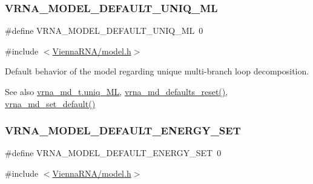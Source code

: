 \subsubsection{\texorpdfstring{V\+R\+N\+A\+\_\+\+M\+O\+D\+E\+L\+\_\+\+D\+E\+F\+A\+U\+L\+T\+\_\+\+U\+N\+I\+Q\+\_\+\+ML}{VRNA\_MODEL\_DEFAULT\_UNIQ\_ML}}
{\footnotesize\ttfamily \#define V\+R\+N\+A\+\_\+\+M\+O\+D\+E\+L\+\_\+\+D\+E\+F\+A\+U\+L\+T\+\_\+\+U\+N\+I\+Q\+\_\+\+ML~0}



{\ttfamily \#include $<$\hyperlink{model_8h}{Vienna\+R\+N\+A/model.\+h}$>$}



Default behavior of the model regarding unique multi-\/branch loop decomposition. 

\begin{DoxySeeAlso}{See also}
\hyperlink{group__model__details_ade065b814a4e2e72ead93ab502613ed2}{vrna\+\_\+md\+\_\+t.\+uniq\+\_\+\+ML}, \hyperlink{group__model__details_ga70834424cf804d149937de89f80ceb45}{vrna\+\_\+md\+\_\+defaults\+\_\+reset()}, \hyperlink{group__model__details_ga8ac6ff84936282436f822644bf841f66}{vrna\+\_\+md\+\_\+set\+\_\+default()} 
\end{DoxySeeAlso}
\mbox{\label{group__model__details_ga6fcf6b2d0f89256cdbd166486c9b6e1e}} 
\subsubsection{\texorpdfstring{V\+R\+N\+A\+\_\+\+M\+O\+D\+E\+L\+\_\+\+D\+E\+F\+A\+U\+L\+T\+\_\+\+E\+N\+E\+R\+G\+Y\+\_\+\+S\+ET}{VRNA\_MODEL\_DEFAULT\_ENERGY\_SET}}
{\footnotesize\ttfamily \#define V\+R\+N\+A\+\_\+\+M\+O\+D\+E\+L\+\_\+\+D\+E\+F\+A\+U\+L\+T\+\_\+\+E\+N\+E\+R\+G\+Y\+\_\+\+S\+ET~0}



{\ttfamily \#include $<$\hyperlink{model_8h}{Vienna\+R\+N\+A/model.\+h}$>$}



